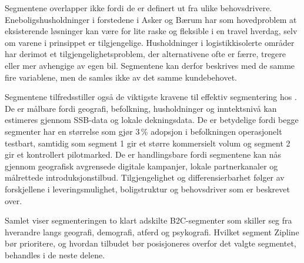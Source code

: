 Segmentene overlapper ikke fordi de er definert ut fra ulike behovsdrivere.
Eneboligshusholdninger i forstedene i Asker og Bærum har som hovedproblem at
eksisterende løsninger kan være for lite raske og fleksible i en travel
hverdag, selv om varene i prinsippet er tilgjengelige. Husholdninger i
logistikkisolerte områder har derimot et tilgjengelighetsproblem, der
alternativene ofte er færre, tregere eller mer avhengige av egen bil.
Segmentene kan derfor beskrives med de samme fire variablene, men de samles
ikke av det samme kundebehovet.


Segmentene tilfredsstiller også de viktigste kravene til effektiv
segmentering hos \textcite{kotlerkellerchernev2022}. De er målbare fordi
geografi, befolkning, husholdninger og inntektsnivå kan estimeres gjennom
SSB-data og lokale dekningsdata. De er betydelige fordi begge segmenter har
en størrelse som gjør 3\,\% adopsjon i befolkningen operasjonelt testbart, samtidig som
segment 1 gir et større kommersielt volum og segment 2 gir et kontrollert
pilotmarked. De er handlingsbare fordi segmentene kan nås gjennom geografisk
avgrensede digitale kampanjer, lokale partnerkanaler og målrettede
introduksjonstilbud. Tilgjengelighet og differensierbarhet følger av
forskjellene i leveringsmulighet, boligstruktur og behovsdriver som er
beskrevet over.

Samlet viser segmenteringen to klart adskilte B2C-segmenter som skiller seg
fra hverandre langs geografi, demografi, atferd og psykografi. Hvilket
segment Zipline bør prioritere, og hvordan tilbudet bør posisjoneres overfor
det valgte segmentet, behandles i de neste delene.
